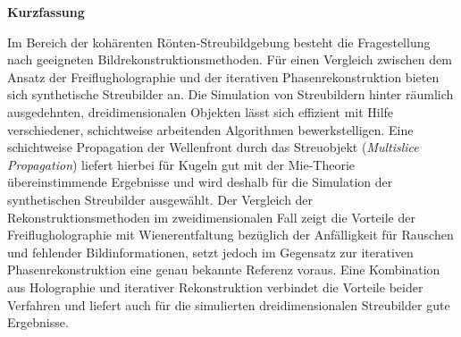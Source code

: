 	\begin{Huge}
		\textbf{Kurzfassung}\vspace{12mm}
	\end{Huge}
	
	Im Bereich der kohärenten Rönten-Streubildgebung besteht die Fragestellung nach geeigneten Bildrekonstruktionsmethoden. Für einen Vergleich zwischen dem Ansatz der Freiflugholographie und der iterativen Phasenrekonstruktion bieten sich synthetische Streubilder an. Die Simulation von Streubildern hinter räumlich ausgedehnten, dreidimensionalen Objekten lässt sich effizient mit Hilfe verschiedener, schichtweise arbeitenden Algorithmen bewerkstelligen. Eine schichtweise Propagation der Wellenfront durch das Streuobjekt (\textit{Multislice Propagation}) liefert hierbei für Kugeln gut mit der Mie-Theorie übereinstimmende Ergebnisse und wird deshalb für die Simulation der synthetischen Streubilder ausgewählt. Der Vergleich der Rekonstruktionsmethoden im zweidimensionalen Fall zeigt die Vorteile der Freiflugholographie mit Wienerentfaltung bezüglich der Anfälligkeit für Rauschen und fehlender Bildinformationen, setzt jedoch im Gegensatz zur iterativen Phasenrekonstruktion eine genau bekannte Referenz voraus. Eine Kombination aus Holographie und iterativer Rekonstruktion verbindet die Vorteile beider Verfahren und liefert auch für die simulierten dreidimensionalen Streubilder gute Ergebnisse.
